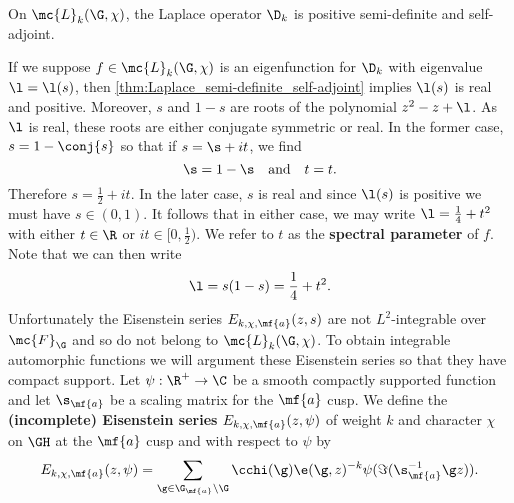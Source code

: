    \begin{theorem}\label{thm:Laplace_semi-definite_self-adjoint}
      On $\mc{L}_{k}(\G,\chi)$, the Laplace operator $\D_{k}$ is positive semi-definite and self-adjoint.
    \end{theorem}

    If we suppose $f \in \mc{L}_{k}(\G,\chi)$ is an eigenfunction for $\D_{k}$ with eigenvalue $\l = \l(s)$, then \cref{thm:Laplace_semi-definite_self-adjoint} implies $\l(s)$ is real and positive. Moreover, $s$ and $1-s$ are roots of the polynomial $z^{2}-z+\l$. As $\l$ is real, these roots are either conjugate symmetric or real. In the former case, $s = 1-\conj{s}$ so that if $s = \s+it$, we find
    \[
      \s = 1-\s \quad \text{and} \quad t = t.
    \]
    Therefore $s = \frac{1}{2}+it$. In the later case, $s$ is real and since $\l(s)$ is positive we must have $s \in (0,1)$. It follows that in either case, we may write $\l = \frac{1}{4}+t^{2}$ with either $t \in \R$ or $it \in [0,\frac{1}{2})$. We refer to $t$ as the \textbf{spectral parameter} of $f$. Note that we can then write
    \[
      \l = s(1-s) = \frac{1}{4}+t^{2}.
    \]
    Unfortunately the Eisenstein series $E_{k,\chi,\mf{a}}(z,s)$ are not $L^{2}$-integrable over $\mc{F}_{\G}$ and so do not belong to $\mc{L}_{k}(\G,\chi)$. To obtain integrable automorphic functions we will argument these Eisenstein series so that they have compact support. Let $\psi:\R^{+} \to \C$ be a smooth compactly supported function and let $\s_{\mf{a}}$ be a scaling matrix for the $\mf{a}$ cusp. We define the \textbf{(incomplete) Eisenstein series} $E_{k,\chi,\mf{a}}(z,\psi)$ of weight $k$ and character $\chi$ on $\GH$ at the $\mf{a}$ cusp and with respect to $\psi$ by
    \[
      E_{k,\chi,\mf{a}}(z,\psi) = \sum_{\g \in \G_{\mf{a}}\backslash\G}\cchi(\g)\e(\g,z)^{-k}\psi(\Im(\s_{\mf{a}}^{-1}\g z)).
    \]
